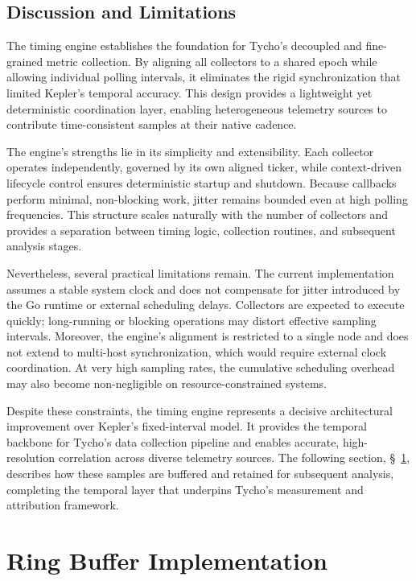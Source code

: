 \subsection{Discussion and Limitations}
\label{subsec:tycho_timing_limits}

The timing engine establishes the foundation for Tycho’s decoupled and fine-grained metric collection.  
By aligning all collectors to a shared epoch while allowing individual polling intervals, it eliminates the rigid synchronization that limited Kepler’s temporal accuracy.  
This design provides a lightweight yet deterministic coordination layer, enabling heterogeneous telemetry sources to contribute time-consistent samples at their native cadence.

The engine’s strengths lie in its simplicity and extensibility.  
Each collector operates independently, governed by its own aligned ticker, while context-driven lifecycle control ensures deterministic startup and shutdown.  
Because callbacks perform minimal, non-blocking work, jitter remains bounded even at high polling frequencies.  
This structure scales naturally with the number of collectors and provides a separation between timing logic, collection routines, and subsequent analysis stages.

Nevertheless, several practical limitations remain.  
The current implementation assumes a stable system clock and does not compensate for jitter introduced by the Go runtime or external scheduling delays.  
Collectors are expected to execute quickly; long-running or blocking operations may distort effective sampling intervals.  
Moreover, the engine’s alignment is restricted to a single node and does not extend to multi-host synchronization, which would require external clock coordination.  
At very high sampling rates, the cumulative scheduling overhead may also become non-negligible on resource-constrained systems.

Despite these constraints, the timing engine represents a decisive architectural improvement over Kepler’s fixed-interval model.  
It provides the temporal backbone for Tycho’s data collection pipeline and enables accurate, high-resolution correlation across diverse telemetry sources.  
The following section, \S~\ref{sec:ringbuffer}, describes how these samples are buffered and retained for subsequent analysis, completing the temporal layer that underpins Tycho’s measurement and attribution framework.

\section{Ring Buffer Implementation}
\label{sec:ringbuffer}

